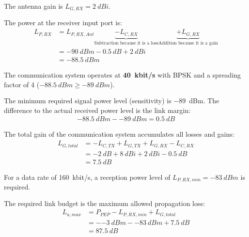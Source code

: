 \begin{solution}
\begin{tasks}
		The antenna gain is $L_{G,RX} = \SI{2}{dBi}$.
		
		The power at the receiver input port is:
		\begin{equation*}
			\begin{split}
				L_{P,RX} &= L_{P,RX,Ant} \underbrace{- L_{C,RX}}_{\text{Subtraction because it is a loss}} \underbrace{+ L_{G,RX}}_{\text{Addition because it is a gain}} \\
				 &= \SI{-90}{dBm} - \SI{0.5}{dB} + \SI{2}{dBi} \\
				 &= \SI{-88.5}{dBm}
			\end{split}
		\end{equation*}
	
		\task
		The communication system operates at \textbf{\SI{40}{kbit/s}} with BPSK and a spreading factor of \num{4} ($\SI{-88.5}{dBm} \geq \SI{-89}{dBm}$).
		
		\task
		The minimum required signal power level (sensitivity) is \SI{-89}{dBm}. The difference to the actual received power level is the link margin:
		\begin{equation*}
			\begin{split}
				\SI{-88.5}{dBm} - \SI{-89}{dBm} = \SI{0.5}{dB}
			\end{split}
		\end{equation*}
		
		\task
		The total gain of the communication system accumulates all losses and gains:
		\begin{equation*}
			\begin{split}
				L_{G,total} &= - L_{C,TX} + L_{G,TX} + L_{G,RX} - L_{C,RX} \\
				&= - \SI{2}{dB} + \SI{8}{dBi} + \SI{2}{dBi} - \SI{0.5}{dB} \\
				&= \SI{7.5}{dB}
			\end{split}
		\end{equation*}
		
		For a data rate of \SI{160}{kbit/s}, a reception power level of $L_{P,RX,min} = \SI{-83}{dBm}$ is required.
		
		The required link budget is the maximum allowed propagation loss:
		\begin{equation*}
			\begin{split}
				L_{a,max} &= P_{PEP} - L_{P,RX,min} + L_{G,total} \\
				&= - \SI{-3}{dBm} - \SI{-83}{dBm} + \SI{7.5}{dB} \\
				&= \SI{87.5}{dB}
			\end{split}
		\end{equation*}
	

\end{tasks}
\end{solution}
